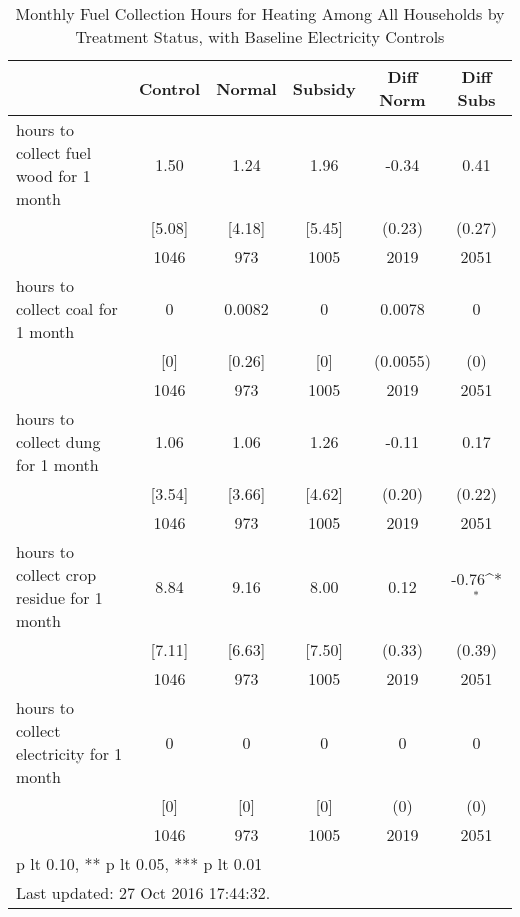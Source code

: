 \begin{table}[htbp]\centering
\def\sym#1{\ifmmode^{#1}\else\(^{#1}\)\fi}
\caption{Monthly Fuel Collection Hours for Heating Among All Households by Treatment Status, with Baseline Electricity Controls \label{tab:"balance"}}
\begin{tabular*}{0.9\hsize}{@{\hskip\tabcolsep\extracolsep\fill}l*{1}{ccccc}}
\toprule
                                &  Control&   Normal&  Subsidy&Diff Norm         &Diff Subs         \\
\midrule
hours to collect fuel wood for 1 month&     1.50&     1.24&     1.96&    -0.34         &     0.41         \\
                                &   [5.08]&   [4.18]&   [5.45]&   (0.23)         &   (0.27)         \\
                                &     1046&      973&     1005&     2019         &     2051         \\
hours to collect coal for 1 month&        0&   0.0082&        0&   0.0078         &        0         \\
                                &      [0]&   [0.26]&      [0]& (0.0055)         &      (0)         \\
                                &     1046&      973&     1005&     2019         &     2051         \\
hours to collect dung for 1 month&     1.06&     1.06&     1.26&    -0.11         &     0.17         \\
                                &   [3.54]&   [3.66]&   [4.62]&   (0.20)         &   (0.22)         \\
                                &     1046&      973&     1005&     2019         &     2051         \\
hours to collect crop residue for 1 month&     8.84&     9.16&     8.00&     0.12         &    -0.76\sym{*}  \\
                                &   [7.11]&   [6.63]&   [7.50]&   (0.33)         &   (0.39)         \\
                                &     1046&      973&     1005&     2019         &     2051         \\
hours to collect electricity for 1 month&        0&        0&        0&        0         &        0         \\
                                &      [0]&      [0]&      [0]&      (0)         &      (0)         \\
                                &     1046&      973&     1005&     2019         &     2051         \\
\bottomrule
\multicolumn{6}{l}{\footnotesize * p lt 0.10, ** p lt 0.05, *** p lt 0.01}\\
\multicolumn{6}{l}{\footnotesize Last updated: 27 Oct 2016 17:44:32.}\\
\end{tabular*}
\end{table}
